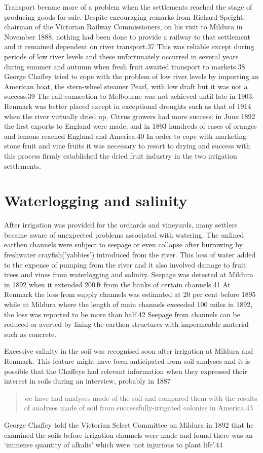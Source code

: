 Transport became more of a problem when the settlements reached the
stage of producing goods for sale.  Despite encouraging remarks from
Richard Speight, chairman of the Victorian Railway Commissioners, on
his visit to Mildura in November 1888, nothing had been done to
provide a railway to that settlement and it remained dependent on
river transport.37 This was reliable except during periods of low
river levels and these unfortunately occurred in several years during
summer and autumn when fresh fruit awaited transport to markets.38
George Chaffey tried to cope with the problem of low river levels by
importing an American boat, the stern-wheel steamer Pearl, with low
draft but it was not a success.39 The rail connection to Melbourne was
not achieved until late in 1903.  Renmark was better placed except in
exceptional droughts such as that of 1914 when the river virtually
dried up.  Citrus growers had more success: in June 1892 the first
exports to England were made, and in 1893 hundreds of cases of oranges
and lemons reached England and America.40 In order to cope with
marketing stone fruit and vine fruits it was necessary to resort to
drying and success with this process firmly established the dried
fruit industry in the two irrigation settlements.

\section{Waterlogging and salinity}

After irrigation was provided for the orchards and vineyards, many
settlers became aware of unexpected problems associated with
watering. The unlined earthen channels were subject to seepage or even
collapse after burrowing by freshwater crayfish('yabbies') introduced
from the river. This loss of water added to the expense of pumping
from the river and it also involved damage to fruit trees and vines
from waterlogging and salinity. Seepage was detected at Mildura in
1892 when it extended 200\,ft from the banks of certain channels.41 At
Renmark the loss from supply channels was estimated at 20 per cent
before 1895 while at Mildura where the length of main channels
exceeded 100 miles in 1892, the loss was reported to be more than
half.42 Seepage from channels can be reduced or averted by lining the
earthen structures with impermeable material such as concrete.

Excessive salinity in the soil was recognised soon after irrigation at
Mildura and Renmark. This feature might have been anticipated from
soil analyses and it is possible that the Chaffeys had relevant
information when they expressed their interest in soils during an
interview, probably in 1887
\begin{quote}
	we have had analyses made of the soil and compared them with
	the results of analyses made of soil from
	successfully-irrigated colonies in America.43
\end{quote}
George Chaffey told the Victorian Select Committee on Mildura in 1892
that he examined the soils before irrigation channels were made and
found there was an `immense quantity of alkalis' which were `not
injurious to plant life'.44

